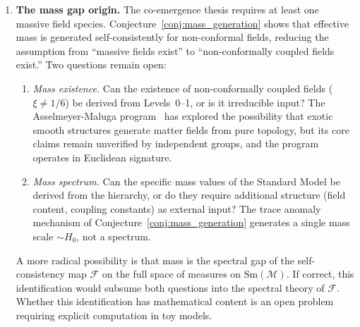 \documentclass[12pt,a4paper]{article}
\theoremstyle{definition}
\theoremstyle{remark}
\begin{document}
\begin{enumerate}

\item \textbf{The mass gap origin.}
The co-emergence thesis requires at least one massive field species.
Conjecture~\ref{conj:mass_generation} shows that effective mass is
generated self-consistently for non-conformal fields, reducing the
assumption from ``massive fields exist'' to ``non-conformally coupled
fields exist.'' Two questions remain open:
\begin{enumerate}
\item[(a)] \emph{Mass existence.} Can the existence of non-conformally
coupled fields ($\xi \neq 1/6$) be derived from Levels~0--1, or is it
irreducible input? The Asselmeyer-Maluga
program~\cite{asselmeyer_maluga} has explored the possibility that
exotic smooth structures generate matter fields from pure topology, but
its core claims remain unverified by independent groups, and the
program operates in Euclidean signature.
\item[(b)] \emph{Mass spectrum.} Can the specific mass values of the
Standard Model be derived from the hierarchy, or do they require
additional structure (field content, coupling constants) as external
input? The trace anomaly mechanism of
Conjecture~\ref{conj:mass_generation} generates a single mass scale
$\sim H_0$, not a spectrum.
\end{enumerate}
A more radical possibility is that mass is the spectral gap of the
self-consistency map $\mathcal{F}$ on the full space of measures on
$\mathrm{Sm}(\mathcal{M})$. If correct, this identification would
subsume both questions into the spectral theory of $\mathcal{F}$. Whether
this identification has mathematical content is an open problem
requiring explicit computation in toy models.


\end{enumerate}
\end{document}

